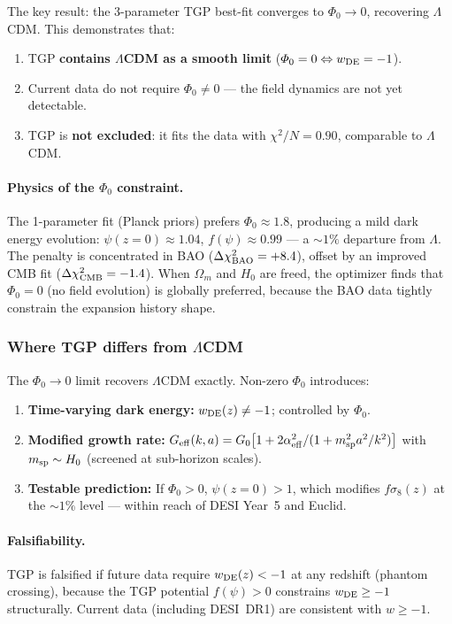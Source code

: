 The key result: the 3-parameter TGP best-fit converges to
$\Phi_0 \to 0$, recovering $\Lambda$CDM.  This demonstrates that:
\begin{enumerate}[nosep]
  \item TGP \textbf{contains $\Lambda$CDM as a smooth limit}
        ($\Phi_0 = 0 \Leftrightarrow w_{\rm DE} = -1$).
  \item Current data do not require $\Phi_0 \neq 0$ --- the field
        dynamics are not yet detectable.
  \item TGP is \textbf{not excluded}: it fits the data with
        $\chi^2/N = 0.90$, comparable to $\Lambda$CDM.
\end{enumerate}

\paragraph{Physics of the $\Phi_0$ constraint.}
The 1-parameter fit (Planck priors) prefers $\Phi_0 \approx 1.8$,
producing a mild dark energy evolution:
$\psi(z=0) \approx 1.04$, $f(\psi) \approx 0.99$
--- a ${\sim}1\%$ departure from $\Lambda$.
The penalty is concentrated in BAO ($\Delta\chi^2_{\rm BAO} = +8.4$),
offset by an improved CMB fit ($\Delta\chi^2_{\rm CMB} = -1.4$).
When $\Omega_m$ and $H_0$ are freed, the optimizer finds that
$\Phi_0 = 0$ (no field evolution) is globally preferred,
because the BAO data tightly constrain the expansion history shape.

\subsubsection{Where TGP differs from $\Lambda$CDM}

The $\Phi_0 \to 0$ limit recovers $\Lambda$CDM exactly.
Non-zero $\Phi_0$ introduces:
\begin{enumerate}[nosep]
  \item \textbf{Time-varying dark energy:}
        $w_{\rm DE}(z) \neq -1$; controlled by $\Phi_0$.
  \item \textbf{Modified growth rate:}
        $G_{\rm eff}(k,a) = G_0\bigl[1 + 2\alpha_{\rm eff}^2/(1 + m_{\rm sp}^2 a^2/k^2)\bigr]$
        with $m_{\rm sp} \sim H_0$ (screened at sub-horizon scales).
  \item \textbf{Testable prediction:}
        If $\Phi_0 > 0$, $\psi(z=0) > 1$, which modifies
        $f\sigma_8(z)$ at the $\sim 1\%$ level ---
        within reach of DESI Year~5 and Euclid.
\end{enumerate}

\paragraph{Falsifiability.}
TGP is falsified if future data require $w_{\rm DE}(z) < -1$
at any redshift (phantom crossing), because the TGP potential
$f(\psi) > 0$ constrains $w_{\rm DE} \geq -1$ structurally.
Current data (including DESI~DR1) are consistent with $w \geq -1$.


